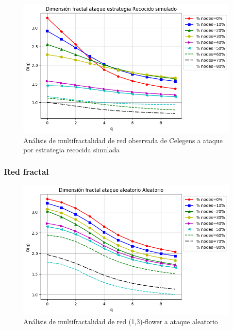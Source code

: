 \begin{figure}[H]
    \centering
    \includegraphics[scale=0.7]{Capitulo6MultifractalidadYRobustez/imagenes/grafica_DqSimulated20180508_020345Celengs.png}
    \caption{Análisis de multifractalidad de red observada de Celegens a ataque por estrategia recocida simulada }
\end{figure}

\subsubsection{Red fractal}
\begin{figure}[H]
    \centering
    \includegraphics[scale=0.7]{Capitulo6MultifractalidadYRobustez/imagenes/grafica_DqRandom20180501_151350floweru1v3.png}
    \caption{Análisis de multifractalidad de red (1,3)-flower a ataque aleatorio }
\end{figure}


